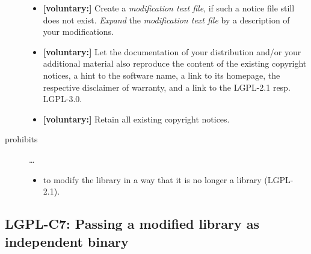 \begin{description}
\begin{itemize}
  \item \textbf{[voluntary:]} Create a \emph{modification text file}, if such a
  notice file still does not exist. \emph{Expand} the \emph{modification text
  file} by a description of your modifications.
  
  \item \textbf{[voluntary:]} Let the documentation of your distribution and/or
  your additional material also reproduce the content of the existing
  copyright notices, a hint to the software name, a link to its homepage,
  the respective disclaimer of warranty, and a link to the LGPL-2.1 resp.
  LGPL-3.0.
  
  \item \textbf{[voluntary:]} Retain all existing copyright notices. 

\end{itemize}

\item[prohibits] \ldots
\begin{itemize}
  \item to modify the library in a way that it is no longer a library
  (LGPL-2.1).
\end{itemize}

\end{description}


\subsection{LGPL-C7: Passing a modified library as independent binary}
\label{OSUC-08B-LGPL}

